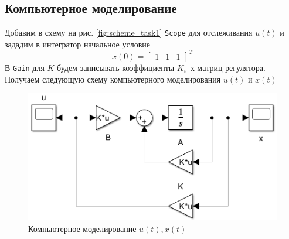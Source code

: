 \documentclass[a4paper, 12pt]{article}
\begin{document}
    \subsection{Компьютерное моделирование}
    Добавим в схему на рис. \ref{fig:scheme_task1} \texttt{Scope} для отслеживания
    $u(t)$ и зададим в интегратор начальное условие $$x(0)=\begin{bmatrix}
        1 &1 &1
    \end{bmatrix}^T$$
    В \texttt{Gain} для $K$ будем записывать коэффициенты $K_i\,$-х матриц регулятора.
    Получаем следующую схему компьютерного моделирования $u(t)$ и $x(t)$
    \begin{figure}[H]
        \centering
        \includegraphics[scale=0.5]{scheme_task1_2.png}
        \captionsetup{skip=0pt}
        \caption{Компьютерное моделирование $u(t),x(t)$}
        \label{fig:scheme_task1_2}
    \end{figure}
\end{document}
